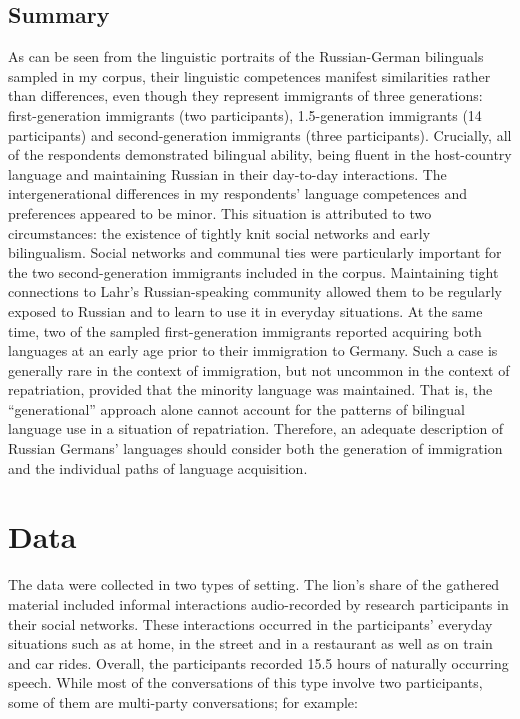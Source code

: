 \subsection{Summary}
\begin{sloppypar}
As can be seen from the linguistic portraits of the  Russian-German bilinguals sampled in my corpus, their linguistic competences manifest similarities rather than differences, even though they represent immigrants of three generations: first-generation immigrants (two participants), 1.5-generation immigrants (14 participants) and  second-generation immigrants (three participants). Crucially, all of the respondents demonstrated bilingual ability, being fluent in the host-country language and maintaining Russian in their day-to-day interactions. The intergenerational differences in my respondents' language competences and preferences appeared to be minor. This situation is attributed to two circumstances: the existence of tightly knit social networks and early bilingualism. Social networks and communal ties were particularly important for the two second-generation immigrants included in the corpus. Maintaining tight connections to Lahr's Russian-speaking community allowed them to be regularly exposed to Russian and to learn to use it in everyday situations. At the same time, two of the sampled first-generation immigrants reported acquiring both languages at an early age prior to their immigration to Germany. Such a case is generally rare in the context of immigration, but not uncommon in the context of repatriation, provided that the minority language was maintained. That is, the “generational” approach alone cannot account for the patterns of bilingual language use in a situation of repatriation. Therefore, an adequate description of Russian Germans' languages should consider both the generation of immigration and the individual paths of language acquisition.
\end{sloppypar}

\section{Data}

The data were collected in two types of setting. The lion's share of the gathered material included informal interactions audio-recorded by research participants in their social networks. These interactions occurred in the participants' everyday situations such as at home, in the street and in a restaurant as well as on train and car rides. Overall, the participants recorded 15.5 hours of naturally occurring speech. While most of the conversations of this type involve two participants, some of them are multi-party conversations; for example: 

